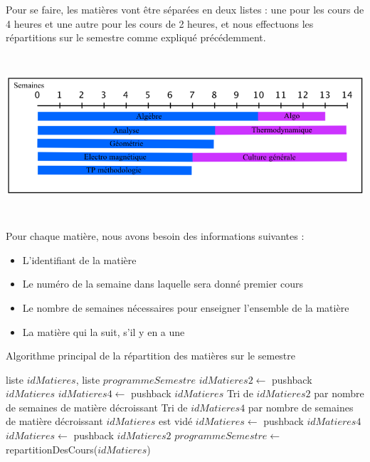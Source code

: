 \documentclass[12pt,a4paper,french]{article}
\begin{document}
Pour se faire, les matières vont être séparées en deux listes : une pour les cours de 4 heures et une autre pour les cours de 2 heures, et nous effectuons les répartitions sur le semestre comme expliqué précédemment.\\

\begin{center}
\includegraphics [width=150mm, height=60mm]{RepartitionSemestre.png}
\end{center}

Pour chaque matière, nous avons besoin des informations suivantes :
\begin{itemize}
\item L'identifiant de la matière
\item Le numéro de la semaine dans laquelle sera donné premier cours
\item Le nombre de semaines nécessaires pour enseigner l'ensemble de la matière
\item La matière qui la suit, s'il y en a une
\end{itemize}

\begin{algorithm}
\caption{Algorithme principal de la répartition des matières sur le semestre}
\begin{algorithmic}
\REQUIRE liste $idMatieres$, liste $programmeSemestre$
\STATE $idMatieres2 \leftarrow$ pushback $idMatieres$
\ELSE
\STATE $idMatieres4 \leftarrow$ pushback $idMatieres$
\ENDIF
\ENDFOR
\STATE Tri de $idMatieres2$ par nombre de semaines de matière décroissant
\STATE Tri de $idMatieres4$ par nombre de semaines de matière décroissant
\STATE $idMatieres$ est vidé
\STATE $idMatieres \leftarrow$ pushback $idMatieres4$
\ENDFOR
{}
\STATE $idMatieres \leftarrow$ pushback $idMatieres2$
\ENDFOR
\RETURN $programmeSemestre \leftarrow$ repartitionDesCours($idMatieres$)
\end{algorithmic}
\end{algorithm}
\end{document}
